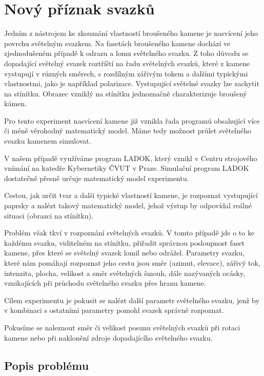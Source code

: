 \chapter{Nový příznak svazků}

Jedním z nástrojem ke zkoumání vlastností broušeného kamene je nasvícení jeho povrchu světelným svazkem. Na fasetách broušeného kamene dochází ve zjednodušeném případě k odrazu a lomu světelného svazku. Z toho důvodu se dopadající světelný svazek roztříští na řadu světelných svazků, které z kamene vystupují v různých směrech, s rozdílným zářivým tokem a dalšími typickými vlastnostmi, jako je například polarizace. 
Vystupující světelné svazky lze zachytit na stínítku. Obrazec vzniklý na stínítku jednoznačně charakterizuje broušený kámen. 

Pro tento experiment nasvícení kamene již vznikla řada programů obsahující více či méně věrohodný matematický model. Máme tedy možnost průlet světelného svazku kamenem simulovat. 

V našem případě využíváme program LADOK, který vznikl v Centru strojového vnímání na katedře Kybernetiky ČVUT v Praze. Simulační program LADOK dostatečně přesně určuje matematický model experimentu.

Cestou, jak určit tvar a další typické vlastností kamene, je rozpoznat vystupující paprsky a nalézt takový matematický model, jehož výstup by odpovídal reálné situaci (obrazci na stínítku). 

Problém však tkví v rozpoznání světelných svazků. V tomto případě jde o to ke každému svazku, viditelném na stínítku, přiřadit správnou posloupnost faset kamene, přes které se světelný svazek lomil nebo odrážel. Parametry svazku, které nám pomáhají rozpoznat jeho cestu jsou směr (azimut, elevace), zářivý tok, intenzita, plocha, velikost a směr světelných šmouh, dále nazývaných ocásky, vznikajících při průchodu světelného svazku přes hranu kamene. 

Cílem experimentu je pokusit se nalézt další parametr světelného svazku, jenž by v kombinaci s ostatními parametry pomohl svazek správně rozpoznat. 

Pokusíme se naleznout směr či velikost posunu světelných svazků při rotaci kamene nebo při naklonění zdroje dopadajícího světelného svazku. 

\newpage
\section{Popis problému}


